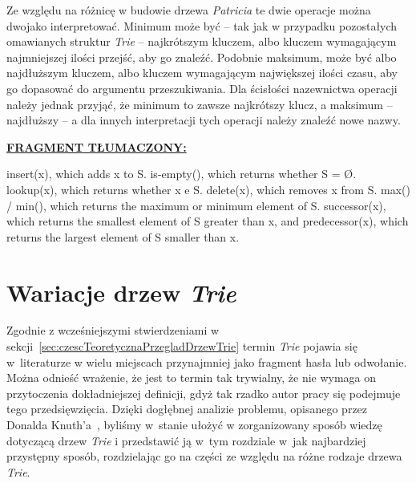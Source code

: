         Ze względu na różnicę w budowie drzewa \emph{Patricia} te dwie operacje można dwojako interpretować. Minimum może być -- tak jak w przypadku pozostałych omawianych struktur \emph{Trie} -- najkrótszym kluczem, albo kluczem wymagającym najmniejszej ilości przejść, aby go znaleźć. Podobnie maksimum, może być albo najdłuższym kluczem, albo kluczem wymagającym największej ilości czasu, aby go dopasować do argumentu przeszukiwania. Dla ścisłości nazewnictwa operacji należy jednak przyjąć, że minimum to zawsze najkrótszy klucz, a maksimum -- najdłuższy -- a dla innych interpretacji tych operacji należy znaleźć nowe nazwy.
		
		\ifsourcematerial
		\begin{displayquote}
			\color{ao(english)}
			\underline{\textbf{FRAGMENT TŁUMACZONY:}} \newline
			
			insert(x), which adds x to S. \newline
			is-empty(), which returns whether S = Ø. \newline
			lookup(x), which returns whether x e S. \newline
			delete(x), which removes x from S. \newline
			max() / min(), which returns the maximum or minimum element of S. \newline
			successor(x), which returns the smallest element of S greater than x, and predecessor(x), which returns the largest element of S smaller than x. 
		\end{displayquote}
		\fi
		
		\section{Wariacje drzew \emph{Trie}}\label{sec:czescTeoretycznaPrzegladDrzewTrieWariacjeDrzewTrie}
		
		Zgodnie z wcześniejszymi stwierdzeniami w sekcji~\ref{sec:czescTeoretycznaPrzegladDrzewTrie} termin \emph{Trie} pojawia się w~literaturze w wielu miejscach przynajmniej jako fragment hasła lub odwołanie. Można odnieść wrażenie, że jest to termin tak trywialny, że nie wymaga on przytoczenia dokładniejszej definicji, gdyż tak rzadko autor pracy się podejmuje tego przedsięwzięcia. Dzięki dogłębnej analizie problemu, opisanego przez Donalda Knuth'a~\cite{KnuthsTheArtOfComputerProgramming3}, byliśmy w~stanie ułożyć w zorganizowany sposób wiedzę dotyczącą drzew \emph{Trie} i przedstawić ją w~tym rozdziale w~jak najbardziej przystępny sposób, rozdzielając go na części ze względu na różne rodzaje drzewa \emph{Trie}.
	
